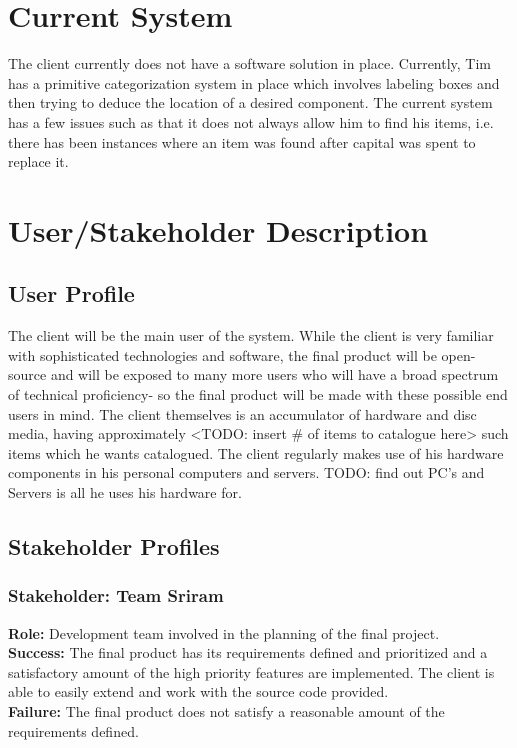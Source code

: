 \documentclass{article}
\begin{document}
\section{Current System}
The client currently does not have a software solution in place.  Currently, Tim has a primitive categorization system in place which involves labeling boxes and then trying to deduce the location of a desired component.  The current system has a few issues such as that it does not always allow him to find his items, i.e. there has been instances where an item was found after capital was spent to replace it.

\section{User/Stakeholder Description}

\subsection{User Profile}
The client will be the main user of the system. While the client is very familiar with sophisticated technologies and software, the final product will be open-source and will be exposed to many more users who will have a broad spectrum of technical proficiency- so the final product will be made with these possible end users in mind. The client themselves is an accumulator of hardware and disc media, having approximately <TODO: insert \# of items to catalogue here> such items which he wants catalogued. The client regularly makes use of his hardware components in his personal computers and servers. TODO: find out PC’s and Servers is all he uses his hardware for.

\subsection{Stakeholder Profiles}

\subsubsection{Stakeholder: Team Sriram}
\textbf{Role:} Development team involved in the planning of the final project.\\
\textbf{Success:} The final product has its requirements defined and prioritized and a satisfactory amount of the high priority features are implemented.  The client is able to easily extend and work with the source code provided.\\
\textbf{Failure:} The final product does not satisfy a reasonable amount of the requirements defined.
\end{document}
